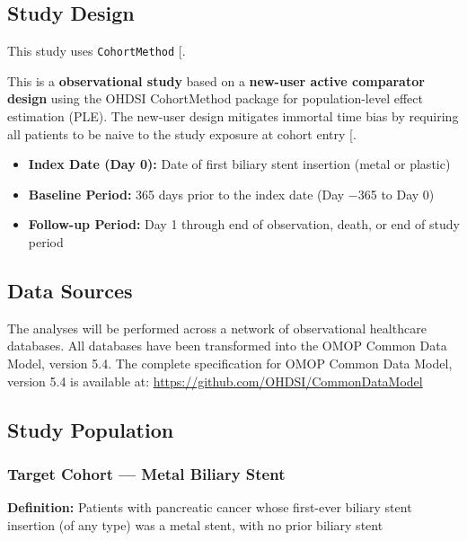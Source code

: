 \documentclass[
  12pt,
]{article}
\providecommand{\tightlist}{%
  \setlength{\itemsep}{0pt}\setlength{\parskip}{0pt}}
\begin{document}
\subsection{Study Design}\label{study-design}

This study uses \texttt{CohortMethod} {[}\citeproc{ref-Schuemie2024}{3}{]}.

This is a \textbf{observational study} based on a \textbf{new-user active comparator design} using the OHDSI CohortMethod package for population-level effect estimation (PLE). The new-user design mitigates immortal time bias by requiring all patients to be naive to the study exposure at cohort entry {[}\citeproc{ref-Suissa2008}{4}{]}.

\begin{itemize}
\tightlist
\item
  \textbf{Index Date (Day 0):} Date of first biliary stent insertion (metal or plastic)
\item
  \textbf{Baseline Period:} 365 days prior to the index date (Day −365 to Day 0)
\item
  \textbf{Follow-up Period:} Day 1 through end of observation, death, or end of study period
\end{itemize}

\subsection{Data Sources}\label{data-sources}

The analyses will be performed across a network of observational healthcare databases. All databases have been transformed into the OMOP Common Data Model, version 5.4. The complete specification for OMOP Common Data Model, version 5.4 is available at: \url{https://github.com/OHDSI/CommonDataModel}

\subsection{Study Population}\label{study-population}

\subsubsection{Target Cohort --- Metal Biliary Stent}\label{target-cohort-metal-biliary-stent}

\textbf{Definition:} Patients with pancreatic cancer whose first-ever biliary stent insertion (of any type) was a metal stent, with no prior biliary stent
\end{document}
